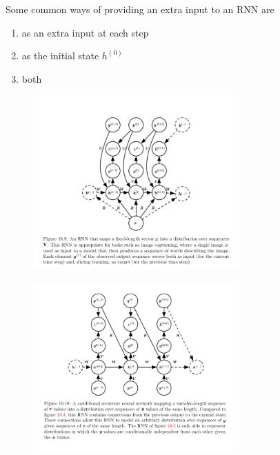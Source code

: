 \documentclass[letterpaper, 12pt]{report}
\begin{document}
Some common ways of providing an extra input to an RNN are

\begin{enumerate}
\item as an extra input at each step
\item as the initial state $h^{(0)}$
\item both
\end{enumerate}


\begin{figure}[h]
  \centering
  \includegraphics[width=0.7\textwidth]{context_1.png}
\end{figure}

\begin{figure}[h]
  \centering
  \includegraphics[width=0.7\textwidth]{context_2.png}
\end{figure}
\end{document}
